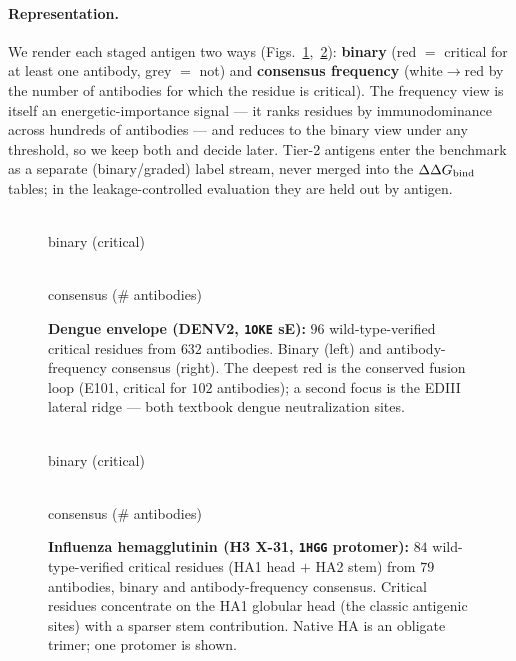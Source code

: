 \paragraph{Representation.} We render each staged antigen two ways
(Figs.~\ref{fig:dengueE-tier2},~\ref{fig:ha-tier2}): \textbf{binary} (red $=$ critical for at
least one antibody, grey $=$ not) and \textbf{consensus frequency} (white$\rightarrow$red by the
number of antibodies for which the residue is critical). The frequency view is itself an
energetic-importance signal --- it ranks residues by immunodominance across hundreds of
antibodies --- and reduces to the binary view under any threshold, so we keep both and decide
later. Tier-2 antigens enter the benchmark as a separate (binary/graded) label stream, never
merged into the $\Delta\Delta G_{\mathrm{bind}}$ tables; in the leakage-controlled evaluation they are held out by antigen.

\begin{figure}[H]\centering
\begin{minipage}[c]{0.30\linewidth}\centering{}\\[-2pt]{\small binary (critical)}\end{minipage}\hfill
\begin{minipage}[c]{0.30\linewidth}\centering{}\\[-2pt]{\small consensus (\# antibodies)}\end{minipage}\hfill
\begin{minipage}[c]{0.13\linewidth}\centering{}\end{minipage}
\caption{\textbf{Dengue envelope (DENV2, \texttt{1OKE} sE):} $96$ wild-type-verified critical
residues from $632$ antibodies. Binary (left) and antibody-frequency consensus (right). The
deepest red is the conserved fusion loop (E101, critical for $102$ antibodies); a second focus is
the EDIII lateral ridge --- both textbook dengue neutralization sites.}\label{fig:dengueE-tier2}
\end{figure}

\begin{figure}[H]\centering
\begin{minipage}[c]{0.42\linewidth}\centering{}\\[-2pt]{\small binary (critical)}\end{minipage}\hfill
\begin{minipage}[c]{0.42\linewidth}\centering{}\\[-2pt]{\small consensus (\# antibodies)}\end{minipage}\hfill
\begin{minipage}[c]{0.12\linewidth}\centering{}\end{minipage}
\caption{\textbf{Influenza hemagglutinin (H3 X-31, \texttt{1HGG} protomer):} $84$
wild-type-verified critical residues (HA1 head $+$ HA2 stem) from $79$ antibodies, binary and
antibody-frequency consensus. Critical residues concentrate on the HA1 globular head (the classic
antigenic sites) with a sparser stem contribution. Native HA is an obligate trimer; one protomer
is shown.}\label{fig:ha-tier2}
\end{figure}
